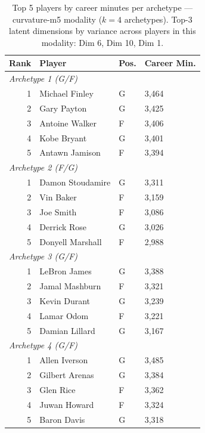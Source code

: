 \begin{table}[htbp]
  \centering\small
  \begin{tabular}{rlll}
    \toprule
    Rank & Player & Pos. & Career Min. \\
    \midrule
    \multicolumn{4}{l}{\textit{Archetype 1 (G/F)}} \\
    \midrule
    1 & Michael Finley & G & 3,464 \\
    2 & Gary Payton & G & 3,425 \\
    3 & Antoine Walker & F & 3,406 \\
    4 & Kobe Bryant & G & 3,401 \\
    5 & Antawn Jamison & F & 3,394 \\
    \midrule[0.4pt]
    \multicolumn{4}{l}{\textit{Archetype 2 (F/G)}} \\
    \midrule
    1 & Damon Stoudamire & G & 3,311 \\
    2 & Vin Baker & F & 3,159 \\
    3 & Joe Smith & F & 3,086 \\
    4 & Derrick Rose & G & 3,026 \\
    5 & Donyell Marshall & F & 2,988 \\
    \midrule[0.4pt]
    \multicolumn{4}{l}{\textit{Archetype 3 (G/F)}} \\
    \midrule
    1 & LeBron James & G & 3,388 \\
    2 & Jamal Mashburn & F & 3,321 \\
    3 & Kevin Durant & G & 3,239 \\
    4 & Lamar Odom & F & 3,221 \\
    5 & Damian Lillard & G & 3,167 \\
    \midrule[0.4pt]
    \multicolumn{4}{l}{\textit{Archetype 4 (G/F)}} \\
    \midrule
    1 & Allen Iverson & G & 3,485 \\
    2 & Gilbert Arenas & G & 3,384 \\
    3 & Glen Rice & F & 3,362 \\
    4 & Juwan Howard & F & 3,324 \\
    5 & Baron Davis & G & 3,318 \\
    \bottomrule
  \end{tabular}
  \caption{Top 5 players by career minutes per archetype --- curvature-m5 modality ($k=4$ archetypes). Top-3 latent dimensions by variance across players in this modality: Dim 6, Dim 10, Dim 1.}
  \label{tab:arch_reps_curvature_m5}
\end{table}

